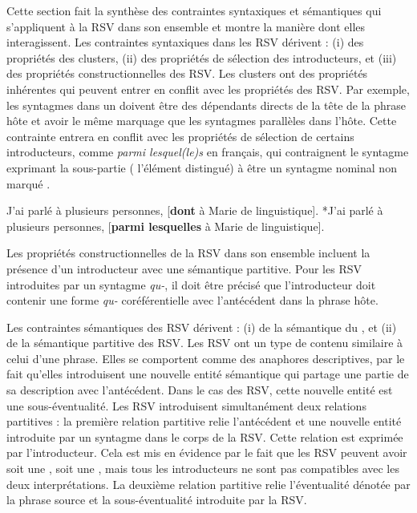 Cette section fait la synthèse des contraintes syntaxiques et sémantiques qui s’appliquent à la RSV dans son ensemble et montre la manière dont elles interagissent.  
Les contraintes syntaxiques dans les RSV dérivent : (i) des propriétés des clusters, (ii) des propriétés de sélection des introducteurs, et (iii) des propriétés cons\-tructionnelles des RSV. Les clusters ont des propriétés inhérentes qui peuvent entrer en conflit avec les propriétés des RSV. Par exemple, les syntagmes dans un  doivent être des dépendants directs de la tête de la phrase hôte et avoir le même marquage que les syntagmes parallèles dans l’hôte. Cette contrainte entrera en conflit avec les propriétés de sélection de certains introducteurs, comme \textit{parmi lesquel(le)s} en français, qui contraignent le syntagme exprimant la sous-partie ({\cad} l’élément distingué) à être un syntagme nominal non marqué .

\ea \label{ch3:ex138}
\ea 
J’ai parlé à plusieurs personnes, [\textbf{dont} à Marie de linguistique]. 
\ex
*J’ai parlé à plusieurs personnes, [\textbf{parmi lesquelles} à Marie de linguistique].
\z 
\z 

Les propriétés constructionnelles de la RSV dans son ensemble incluent la présence d’un introducteur avec une sémantique partitive. Pour les RSV introduites par un syntagme \textit{qu-}, il doit être précisé que l’introducteur doit contenir une forme \textit{qu-} coréférentielle avec l’antécédent dans la phrase hôte.

Les contraintes sémantiques des RSV dérivent : (i) de la sémantique du , et (ii) de la sémantique partitive des RSV. Les RSV ont un type de contenu similaire à celui d’une phrase. Elles se comportent comme des anaphores descriptives, par le fait qu’elles introduisent une nouvelle entité sémantique qui partage une partie de sa description avec l’antécédent. Dans le cas des RSV, cette nouvelle entité est une sous-éventualité. Les RSV introduisent simultanément deux relations partitives : la première relation partitive relie l’antécédent et une nouvelle entité introduite par un syntagme dans le corps de la RSV. Cette relation est exprimée par l’introducteur. Cela est mis en évidence par le fait que les RSV peuvent avoir soit une , soit une , mais tous les introducteurs ne sont pas compatibles avec les deux interprétations. La deuxième relation partitive relie l’éventualité dénotée par la phrase source et la sous-éventualité introduite par la RSV.

